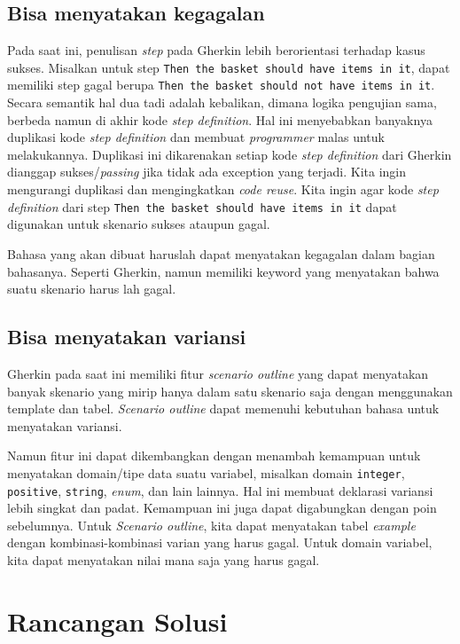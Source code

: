 \subsection*{Bisa menyatakan kegagalan}

Pada saat ini, penulisan \emph{step} pada Gherkin lebih berorientasi terhadap
kasus sukses. Misalkan untuk step \texttt{Then the basket should have items in it},
dapat memiliki step gagal berupa \texttt{Then the basket should not have items in it}.
Secara semantik hal dua tadi adalah kebalikan, dimana logika pengujian
sama, berbeda namun di akhir kode \emph{step definition}. Hal ini
menyebabkan banyaknya duplikasi kode \emph{step definition} dan membuat \emph{programmer} malas untuk
melakukannya.
Duplikasi ini dikarenakan setiap kode \emph{step definition} dari Gherkin dianggap
sukses/\emph{passing} jika tidak ada exception yang terjadi.
Kita ingin mengurangi duplikasi dan mengingkatkan \emph{code reuse}.
Kita ingin agar kode \emph{step definition} dari step \texttt{Then the basket should have items in it}
dapat digunakan untuk skenario sukses ataupun gagal.

Bahasa yang akan dibuat haruslah dapat menyatakan kegagalan dalam bagian bahasanya.
Seperti Gherkin, namun memiliki keyword yang menyatakan bahwa suatu skenario
harus lah gagal.

\subsection*{Bisa menyatakan variansi}

Gherkin pada saat ini memiliki fitur \emph{scenario outline} yang dapat menyatakan banyak skenario yang mirip
hanya dalam satu skenario saja dengan menggunakan template dan tabel.
\emph{Scenario outline} dapat memenuhi kebutuhan bahasa untuk menyatakan variansi.

Namun fitur ini dapat dikembangkan dengan menambah kemampuan untuk menyatakan domain/tipe data suatu variabel, misalkan
domain \texttt{integer}, \texttt{positive}, \texttt{string}, \emph{enum}, dan lain lainnya.
Hal ini membuat deklarasi variansi lebih singkat dan padat.
Kemampuan ini juga dapat digabungkan dengan poin sebelumnya.
Untuk \emph{Scenario outline}, kita dapat menyatakan tabel \emph{example} dengan kombinasi-kombinasi varian yang harus gagal.
Untuk domain variabel, kita dapat menyatakan nilai mana saja yang harus gagal.


\section{Rancangan Solusi}

